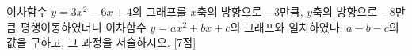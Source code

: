 이차함수 $y=3x^2-6x+4$의 그래프를 $x$축의 방향으로 $-3$만큼, $y$축의 방향으로 $-8$만큼 평행이동하였더니 이차함수 $y=ax^2+bx+c$의 그래프와 일치하였다. $a-b-c$의 값을 구하고, 그 과정을 서술하시오.  \mbox{[7점]}
